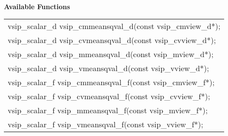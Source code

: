 \\\cvsiplh
\newline \hspace*{.8cm} \vspace*{.1cm} \textbf{Available Functions }
\newline \hspace*{1.1cm} {
\ttfamily
\begin{tabular}[H]{l}
vsip\_scalar\_d vsip\_cmmeansqval\_d(const vsip\_cmview\_d*);\\
vsip\_scalar\_d vsip\_cvmeansqval\_d(const vsip\_cvview\_d*);\\
vsip\_scalar\_d vsip\_mmeansqval\_d(const vsip\_mview\_d*);\\
vsip\_scalar\_d vsip\_vmeansqval\_d(const vsip\_vview\_d*);\\
vsip\_scalar\_f vsip\_cmmeansqval\_f(const vsip\_cmview\_f*);\\
vsip\_scalar\_f vsip\_cvmeansqval\_f(const vsip\_cvview\_f*);\\
vsip\_scalar\_f vsip\_mmeansqval\_f(const vsip\_mview\_f*);\\
vsip\_scalar\_f vsip\_vmeansqval\_f(const vsip\_vview\_f*);\\
\end{tabular}
}
\\\pyjvsiph
{}
